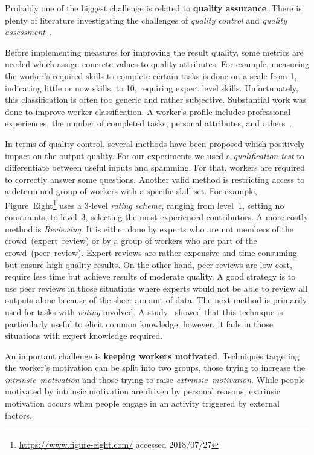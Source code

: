 Probably one of the biggest challenge is related to \textbf{quality assurance}. There is plenty of literature investigating the challenges of \emph{quality control} and \emph{quality assessment}~\cite{allahbakhsh2013, daniel2018, hansen2013, hsueh2009}.

Before implementing measures for improving the result quality, some metrics are needed which assign concrete values to quality attributes. For example, measuring the worker's required skills to complete certain tasks is done on a scale from 1, indicating little or now skills, to 10, requiring expert level skills. Unfortunately, this classification is often too generic and rather subjective. Substantial work was done to improve worker classification. A worker's profile includes professional experiences, the number of completed tasks, personal attributes, and others~\cite{daniel2018}. 

In terms of quality control, several methods have been proposed which positively impact on the output quality. 
For our experiments we used a \emph{qualification test} to differentiate between useful inputs and spamming. For that, workers are required to correctly answer some questions. Another valid method is restricting access to a determined group of workers with a specific skill set. For example, Figure~Eight\footnote{\url{https://www.figure-eight.com/} accessed 2018/07/27} uses a 3-level \emph{rating scheme}, ranging from level~1, setting no constraints, to level~3, selecting the most experienced contributors. A more costly method is \emph{Reviewing}. It is either done by experts who are not members of the crowd~(expert~review) or by a group of workers who are part of the crowd~(peer~review). Expert reviews are rather expensive and time consuming but ensure high quality results. On the other hand, peer reviews are low-cost, require less time but achieve results of moderate quality. A good strategy is to use peer reviews in those situations where experts would not be able to review all outputs alone because of the sheer amount of data. 
The next method is primarily used for tasks with \emph{voting} involved. A study~\cite{waggoner2014} showed that this technique is particularly useful to elicit common knowledge, however, it fails in those situations with expert knowledge required. 

An important challenge is \textbf{keeping workers motivated}. Techniques targeting the worker's motivation can be split into two groups, those trying to increase the \emph{intrinsic~motivation} and those trying to raise \emph{extrinsic~motivation}. While people motivated by intrinsic motivation are driven by personal reasons, extrinsic motivation occurs when people engage in an activity triggered by external factors. 

